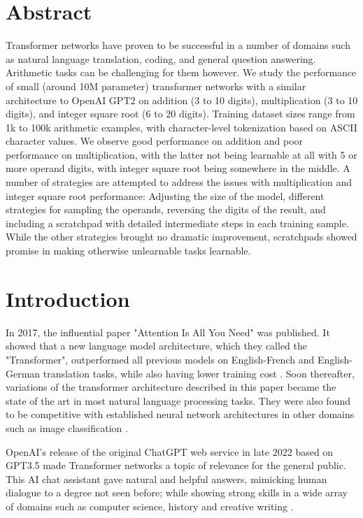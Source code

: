 \thispagestyle{empty}

\section*{Abstract}

Transformer networks have proven to be successful in a number of domains such as natural language translation, coding, and general question answering. Arithmetic tasks can be challenging for them however.
We study the performance of small (around 10M parameter) transformer networks with a similar architecture to OpenAI GPT2 on addition (3 to 10 digits), multiplication (3 to 10 digits), and integer square root (6 to 20 digits). Training dataset sizes range from 1k to 100k arithmetic examples, with character-level tokenization based on ASCII character values.
We observe good performance on addition and poor performance on multiplication, with the latter not being learnable at all with 5 or more operand digits, with integer square root being somewhere in the middle.
A number of strategies are attempted to address the issues with multiplication and integer square root performance: Adjusting the size of the model, different strategies for sampling the operands, reversing the digits of the result, and including a scratchpad with detailed intermediate steps in each training sample.
While the other strategies brought no dramatic improvement, scratchpads showed promise in making otherwise unlearnable tasks learnable.


\clearpage

\tableofcontents
\clearpage

\section{Introduction}

In 2017, the influential paper "Attention Is All You Need" \cite{allyouneed} was published. It showed that a new language model architecture, which they called the "Transformer", outperformed all previous models on English-French and English-German translation tasks, while also having lower training cost . Soon thereafter, variations of the transformer architecture described in this paper became the state of the art in most natural language processing tasks. They were also found to be competitive with established neural network architectures in other domains such as image classification .

OpenAI's release of the original ChatGPT web service in late 2022 based on GPT3.5 \cite{openai_chatgpt_2022} made Transformer networks a topic of relevance for the general public. This AI chat assistant gave natural and helpful answers, mimicking human dialogue to a degree not seen before; while showing strong skills in a wide array of domains such as computer science, history and creative writing \cite{Savelka_2023} .

